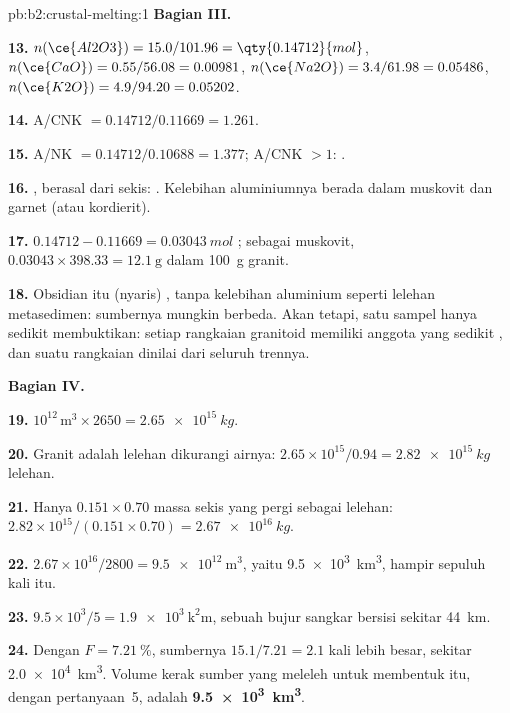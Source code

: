 \begin{solution}{pb:b2:crustal-melting:1}
\noindent\textbf{Bagian III.}

\textbf{13.} $n(\ce{Al2O3}) = 15.0/101.96 = \qty{0.14712}{mol}$, $n(\ce{CaO}) =
0.55/56.08 = 0.00981$, $n(\ce{Na2O}) = 3.4/61.98 = 0.05486$, $n(\ce{K2O}) = 4.9/94.20 =
0.05202$.

\textbf{14.} A/CNK $= 0.14712/0.11669 = 1.261$.

\textbf{15.} A/NK $= 0.14712/0.10688 = 1.377$; A/CNK $> 1$: .

\textbf{16.} , berasal dari sekis: . Kelebihan aluminiumnya berada dalam
muskovit dan garnet (atau kordierit).

\textbf{17.} $0.14712 - 0.11669 = \qty{0.03043}{mol}$ ; sebagai muskovit,
$0.03043\times398.33 = \qty{12.1}{\gram}$ dalam \qty{100}{\gram} granit.

\textbf{18.} Obsidian itu (nyaris) , tanpa kelebihan aluminium seperti lelehan
metasedimen: sumbernya mungkin berbeda. Akan tetapi, satu sampel hanya sedikit membuktikan:
setiap rangkaian granitoid memiliki anggota yang sedikit , dan suatu rangkaian dinilai dari seluruh
trennya.

\noindent\textbf{Bagian IV.}

\textbf{19.} $10^{12}\,\unit{\cubic\metre}\times2650 = \qty{2.65e15}{kg}$.

\textbf{20.} Granit adalah lelehan dikurangi airnya: $2.65\times10^{15}/0.94 =
\qty{2.82e15}{kg}$ lelehan.

\textbf{21.} Hanya $0.151\times0.70$ massa sekis yang pergi sebagai lelehan:
$2.82\times10^{15}/(0.151\times0.70) = \qty{2.67e16}{kg}$.

\textbf{22.} $2.67\times10^{16}/2800 = \qty{9.5e12}{\cubic\metre}$, yaitu
\qty{9.5e3}{\cubic\kilo\metre}, hampir sepuluh kali  itu.

\textbf{23.} $9.5\times10^3/5 = \qty{1.9e3}{\square\kilo\metre}$, sebuah bujur sangkar bersisi sekitar
\qty{44}{km}.

\textbf{24.} Dengan $F = \qty{7.21}{\percent}$, sumbernya $15.1/7.21 = 2.1$ kali
lebih besar, sekitar \qty{2.0e4}{\cubic\kilo\metre}. Volume kerak sumber yang meleleh untuk membentuk
 itu, dengan  pertanyaan~5, adalah
\textbf{\qty[text-series-to-math=true]{9.5e3}{\cubic\kilo\metre}}.
\end{solution}

